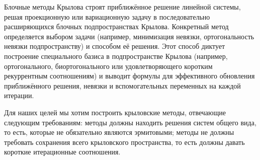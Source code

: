 Блочные методы Крылова строят приближённое решение линейной системы, решая проекционную или вариационную задачу в последовательно расширяющихся блочных подпространствах Крылова. Конкретный метод определяется выбором задачи (например, минимизация невязки, ортогональность невязки подпространству) и способом её решения. Этот способ диктует построение специального базиса в подпространстве Крылова (например, ортогонального, биортогонального или удовлетворяющего коротким
рекуррентным соотношениям) и выводит формулы для эффективного обновления приближённого решения, невязки и вспомогательных переменных на каждой итерации.
\par Для наших целей мы хотим построить крыловские методы, отвечающие следующим требованиям: методы должны находить
решения систем общего вида, то есть, которые не обязательно являются эрмитовыми;
методы не должны требовать сохранения всего крыловского пространства, то есть должны 
давать короткие итерационные соотношения.


\newpage
